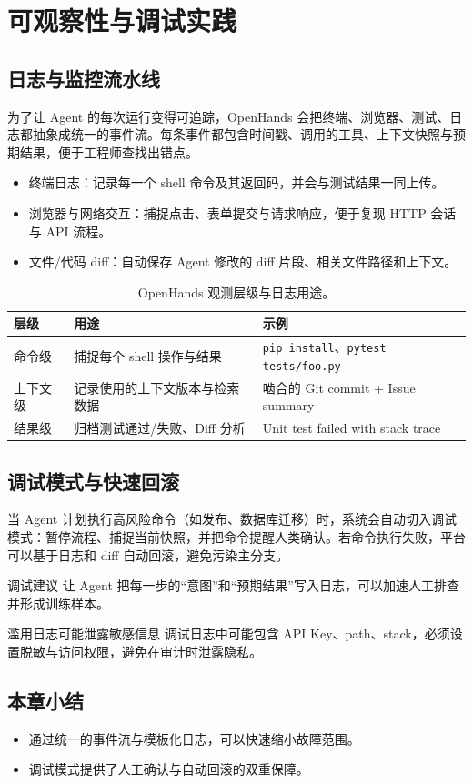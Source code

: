 \section{可观察性与调试实践}
\subsection{日志与监控流水线}
为了让 Agent 的每次运行变得可追踪，OpenHands 会把终端、浏览器、测试、日志都抽象成统一的事件流。每条事件都包含时间戳、调用的工具、上下文快照与预期结果，便于工程师查找出错点。

\begin{itemize}
    \item 终端日志：记录每一个 shell 命令及其返回码，并会与测试结果一同上传。
    \item 浏览器与网络交互：捕捉点击、表单提交与请求响应，便于复现 HTTP 会话与 API 流程。
    \item 文件/代码 diff：自动保存 Agent 修改的 diff 片段、相关文件路径和上下文。
\end{itemize}

\begin{table}[H]
\centering
\begin{tabular}{p{} p{} p{}}
\toprule
层级 & 用途 & 示例 \\
\midrule
命令级 & 捕捉每个 shell 操作与结果 & \texttt{pip install}、\texttt{pytest tests/foo.py} \\
\midrule
上下文级 & 记录使用的上下文版本与检索数据 & 啮合的 Git commit + Issue summary \\
\midrule
结果级 & 归档测试通过/失败、Diff 分析 & Unit test failed with stack trace \\
\bottomrule
\end{tabular}
\caption{OpenHands 观测层级与日志用途。}
\end{table}

\subsection{调试模式与快速回滚}
当 Agent 计划执行高风险命令（如发布、数据库迁移）时，系统会自动切入调试模式：暂停流程、捕捉当前快照，并把命令提醒人类确认。若命令执行失败，平台可以基于日志和 diff 自动回滚，避免污染主分支。

\begin{knowledgebox}{调试建议}
让 Agent 把每一步的“意图”和“预期结果”写入日志，可以加速人工排查并形成训练样本。
\end{knowledgebox}

\begin{warningbox}{滥用日志可能泄露敏感信息}
调试日志中可能包含 API Key、path、stack，必须设置脱敏与访问权限，避免在审计时泄露隐私。
\end{warningbox}

\subsection{本章小结}
\begin{itemize}
    \item 通过统一的事件流与模板化日志，可以快速缩小故障范围。
    \item 调试模式提供了人工确认与自动回滚的双重保障。
\end{itemize}

